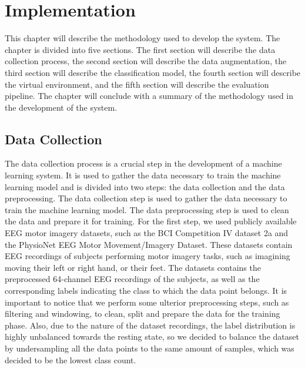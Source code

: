 \chapter{Implementation}\label{ch:methodology}
This chapter will describe the methodology used to develop the system.
The chapter is divided into five sections.
The first section will describe the data collection process, the second section will describe the data augmentation, the third section will describe the classification model, the fourth section will describe the virtual environment, and the fifth section will describe the evaluation pipeline.
The chapter will conclude with a summary of the methodology used in the development of the system.

\section{Data Collection}
The data collection process is a crucial step in the development of a machine learning system.
It is used to gather the data necessary to train the machine learning model and is divided into two steps: the data collection and the data preprocessing.
The data collection step is used to gather the data necessary to train the machine learning model.
The data preprocessing step is used to clean the data and prepare it for training.
For the first step, we used publicly available EEG motor imagery datasets, such as the BCI Competition IV dataset 2a and the PhysioNet EEG Motor Movement/Imagery Dataset.
These datasets contain EEG recordings of subjects performing motor imagery tasks, such as imagining moving their left or right hand, or their feet.
The datasets contains the preprocessed 64-channel EEG recordings of the subjects, as well as the corresponding labels indicating the class to which the data point belongs.
It is important to notice that we perform some ulterior preprocessing steps, such as filtering and windowing, to clean, split and prepare the data for the training phase.
Also, due to the nature of the dataset recordings, the label distribution is highly unbalanced towards the resting state, so we decided to balance the dataset by undersampling all the data points to the same amount of samples, which was decided to be the lowest class count.
